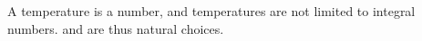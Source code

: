 A temperature is a number, and temperatures are not limited to integral numbers.  and  are thus natural choices.
